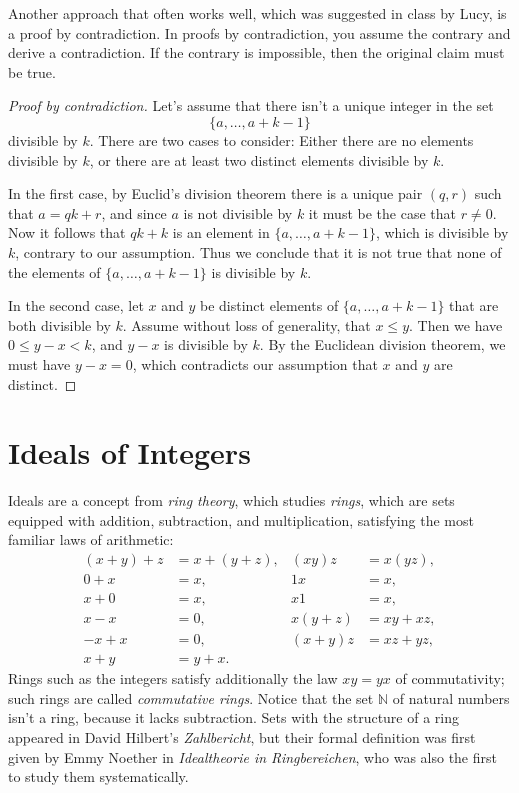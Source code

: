 Another approach that often works well, which was suggested in class by Lucy, is a proof by contradiction. In proofs by contradiction, you assume the contrary and derive a contradiction. If the contrary is impossible, then the original claim must be true.

\begin{proof}[Proof by contradiction]
  Let's assume that there isn't a unique integer in the set
  \begin{equation*}
    \{a,\ldots,a+k-1\}
  \end{equation*}
  divisible by $k$. There are two cases to consider: Either there are no elements divisible by $k$, or there are at least two distinct elements divisible by $k$.

  In the first case, by Euclid's division theorem there is a unique pair $(q,r)$ such that $a=qk+r$, and since $a$ is not divisible by $k$ it must be the case that $r \neq 0$. Now it follows that $qk+k$ is an element in $\{a,\ldots,a+k-1\}$, which is divisible by $k$, contrary to our assumption. Thus we conclude that it is not true that none of the elements of $\{a,\ldots,a+k-1\}$ is divisible by $k$.

  In the second case, let $x$ and $y$ be distinct elements of $\{a,\ldots,a+k-1\}$ that are both divisible by $k$. Assume without loss of generality, that $x\leq y$. Then we have $0\leq y-x < k$, and $y-x$ is divisible by $k$. By the Euclidean division theorem, we must have $y-x=0$, which contradicts our assumption that $x$ and $y$ are distinct.
\end{proof}

\section{Ideals of Integers}

Ideals are a concept from \emph{ring theory}, which studies \emph{rings}, which are sets equipped with addition, subtraction, and multiplication, satisfying the most familiar laws of arithmetic:
\begin{align*}
  (x+y)+z & = x+(y+z), & (xy)z & = x(yz), \\
  0+x & = x, & 1x & = x, \\
  x+0 & = x, & x1 & = x, \\
  x-x & = 0, & x(y+z) & = xy + xz, \\
  -x+x & = 0, & (x+y)z & = xz + yz, \\
  x+y & = y+x.
\end{align*}
Rings such as the integers satisfy additionally the law $xy=yx$ of commutativity; such rings are called \emph{commutative rings}. Notice that the set $\mathbb{N}$ of natural numbers isn't a ring, because it lacks subtraction. Sets with the structure of a ring appeared in David Hilbert's \emph{Zahlbericht}, but their formal definition was first given by Emmy Noether in \emph{Idealtheorie in Ringbereichen}, who was also the first to study them systematically.

